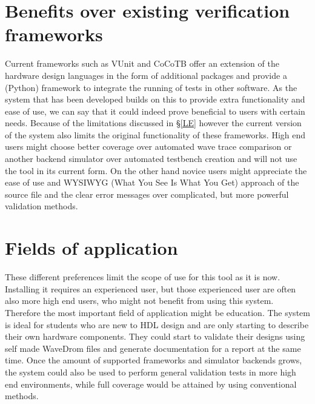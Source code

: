 \section{Benefits over existing verification frameworks}
Current frameworks such as VUnit and CoCoTB offer an extension of the hardware design languages in the form of additional packages and provide a (Python) framework to integrate the running of tests in other software. As the system that has been developed builds on this to provide extra functionality and ease of use, we can say that it could indeed prove beneficial to users with certain needs. Because of the limitations discussed in §\ref{LE} however the current version of the system also limits the original functionality of these frameworks.
\npar
High end users might choose better coverage over automated wave trace comparison or another backend simulator over automated testbench creation and will not use the tool in its current form. On the other hand novice users might appreciate the ease of use and WYSIWYG (What You See Is What You Get) approach of the source file and the clear error messages over complicated, but more powerful validation methods.
\section{Fields of application}
These different preferences limit the scope of use for this tool as it is now. Installing it requires an experienced user, but those experienced user are often also more high end users, who might not benefit from using this system. Therefore the most important field of application might be education. The system is ideal for students who are new to HDL design and are only starting to describe their own hardware components. They could start to validate their designs using self made WaveDrom files and generate documentation for a report at the same time.
\npar
Once the amount of supported frameworks and simulator backends grows, the system could also be used to perform general validation tests in more high end environments, while full coverage would be attained by using conventional methods.
